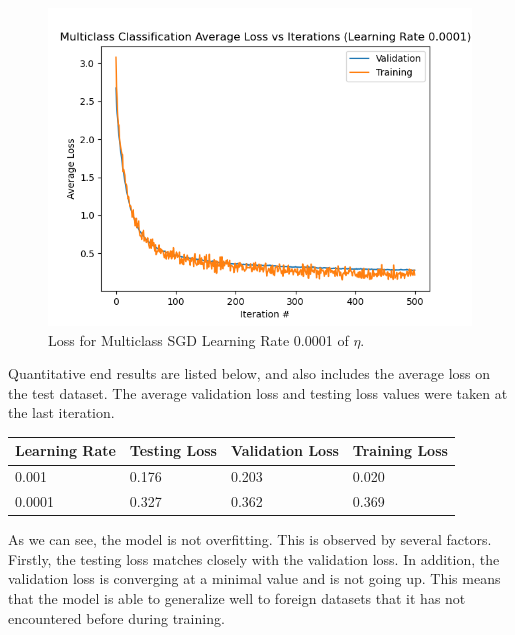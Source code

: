 \documentclass[11pt,letterpaper,titlepage]{article}
\begin{document}
	\begin{figure}[H]
		\includegraphics[width=\linewidth]{Multiclass Classification Average Loss vs Iterations (Learning Rate 0.0001).png}
		\caption{Loss for Multiclass SGD Learning Rate 0.0001 of $\eta$.}
		\label{fig: SGD Multi LR 0.0001}
	\end{figure}

	Quantitative end results are listed below, and also includes the average loss on the test dataset. The average validation loss and testing loss values were taken at the last iteration.
	
	\begin{tabular}{|l|l|l|l|}
		\hline
		Learning Rate & Testing Loss     & Validation Loss & Training Loss \\ \hline
		0.001          & 0.176            & 0.203         & 0.020          \\ \hline
		0.0001         & 0.327            & 0.362         & 0.369          \\ \hline
	\end{tabular}
	\label{SGD Multi}
	
	As we can see, the model is not overfitting. This is observed by several factors. Firstly, the testing loss matches closely with the validation loss. In addition, the validation loss is converging at a minimal value and is not going up. This means that the model is able to generalize well to foreign datasets that it has not encountered before during training.
	
\end{document}
